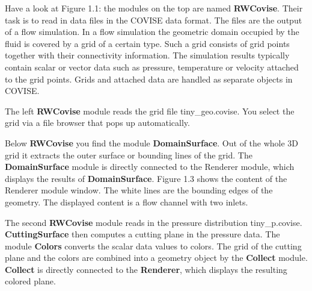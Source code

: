 Have a look at Figure 1.1: the modules on the top are named {\bf RWCovise}. Their task 
is to read in data files in the COVISE data format.
The files are the output of a flow simulation. In a flow simulation the geometric 
domain occupied by the fluid is covered by a grid of a certain type. Such a grid 
consists of grid points together with their connectivity information. The 
simulation results typically contain scalar or vector data such as pressure, 
temperature or velocity attached to the grid points. Grids and attached data are 
handled as separate objects in COVISE. 

The left {\bf RWCovise} module reads the grid file tiny\_geo.covise. You select the grid 
via a file browser that pops up automatically. 

Below {\bf RWCovise} you find the module {\bf DomainSurface}. Out of the whole 3D grid it 
extracts the outer surface or bounding lines of the grid. The {\bf DomainSurface} module 
is directly connected to the Renderer module, which displays the results of 
{\bf DomainSurface}.
Figure 1.3 shows the content of the Renderer module window. The white lines are the 
bounding edges of the geometry. The displayed content is a flow channel with two 
inlets.

The second {\bf RWCovise} module reads in the pressure distribution tiny\_p.covise. 
{\bf CuttingSurface} then computes a cutting plane in the pressure data. The module 
{\bf Colors} converts the scalar data values to colors. The grid of the cutting plane
and the colors are combined into a geometry object by the {\bf Collect} module. 
{\bf Collect} is directly connected to the {\bf Renderer}, which displays the resulting
colored plane. 



